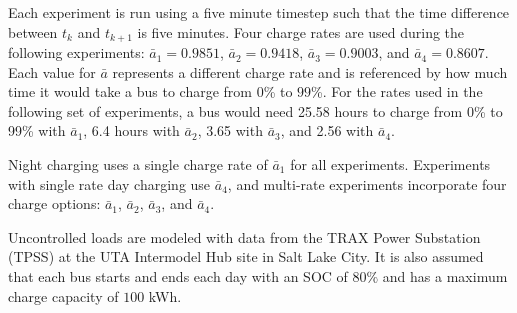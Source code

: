 \par Each experiment is run using a five minute timestep such that the time difference between $t_k$ and $t_{k+1}$ is five minutes.  Four charge rates are used during the following experiments: $\bar{a}_1 = 0.9851$, $\bar{a}_2 = 0.9418$, $\bar{a}_3 = 0.9003$, and $\bar{a}_4 = 0.8607$.  Each value for $\bar{a}$ represents a different charge rate and is referenced by how much time it would take a bus to charge from $0$\% to $99$\%. For the rates used in the following set of experiments, a bus would need 25.58 hours to charge from 0\% to 99\% with $\bar{a}_1$, 6.4 hours with $\bar{a}_2$, 3.65 with $\bar{a}_3$, and 2.56 with $\bar{a}_4$. 
\par Night charging uses a single charge rate of $\bar{a}_1$ for all experiments. Experiments with single rate day charging use $\bar{a}_4$, and multi-rate experiments incorporate four charge options: $\bar{a}_1$, $\bar{a}_2$, $\bar{a}_3$, and $\bar{a}_4$.
\par Uncontrolled loads are modeled with data from the TRAX Power Substation (TPSS) at the UTA Intermodel Hub site in Salt Lake City. It is also assumed that each bus starts and ends each day with an SOC of $80\%$ and has a maximum charge capacity of $100$ kWh.
